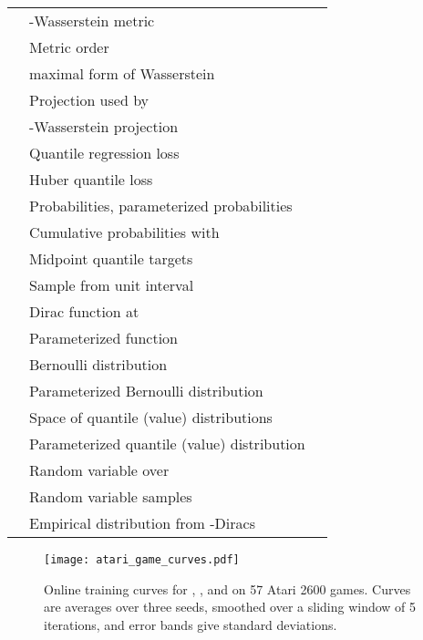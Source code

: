 \documentclass[letterpaper]{article}
\begin{document}
\begin{table}[ht]
\begin{tabular}{lll}
           & -Wasserstein metric \\
           & Metric order  \\
          & maximal form of Wasserstein \\
          & Projection used by \\
     & -Wasserstein projection \\
     & Quantile regression loss \\
   & Huber quantile loss \\
   & Probabilities, parameterized probabilities \\
   & Cumulative probabilities with \\
   & Midpoint quantile targets\\
        & Sample from unit interval \\
      & Dirac function at \\
        & Parameterized function \\
             & Bernoulli distribution \\
       & Parameterized Bernoulli distribution \\
          & Space of quantile (value) distributions \\
      & Parameterized quantile (value) distribution \\
             & Random variable over \\
   & Random variable samples\\
     & Empirical distribution from -Diracs
\end{tabular}
\end{table}

\begin{figure*}[t]
\begin{center}
\texttt{[image: atari\_game\_curves.pdf]}
\end{center}
\caption{Online training curves for , , and  on 57 Atari 2600 games. Curves are averages over three seeds, smoothed over a sliding window of 5 iterations, and error bands give standard deviations.\label{fig:all_games}}
\end{figure*}

\newpage
\end{document}
